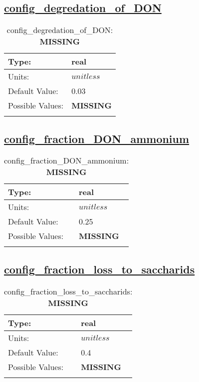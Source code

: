 \subsection[config\_degredation\_of\_DON]{\hyperref[sec:nm_tab_biogeochemistry]{config\_degredation\_of\_DON}}
\label{subsec:nm_sec_config_degredation_of_DON}
\begin{center}
\begin{longtable}{| p{2.0in} || p{4.0in} |}
    \hline
    Type: & real \\
    \hline
    Units: & $unitless$ \\
    \hline
    Default Value: & 0.03 \\
    \hline
    Possible Values: & {\bf \color{red} MISSING} \\
    \hline
    \caption{config\_degredation\_of\_DON: {\bf \color{red} MISSING}}
\end{longtable}
\end{center}
\subsection[config\_fraction\_DON\_ammonium]{\hyperref[sec:nm_tab_biogeochemistry]{config\_fraction\_DON\_ammonium}}
\label{subsec:nm_sec_config_fraction_DON_ammonium}
\begin{center}
\begin{longtable}{| p{2.0in} || p{4.0in} |}
    \hline
    Type: & real \\
    \hline
    Units: & $unitless$ \\
    \hline
    Default Value: & 0.25 \\
    \hline
    Possible Values: & {\bf \color{red} MISSING} \\
    \hline
    \caption{config\_fraction\_DON\_ammonium: {\bf \color{red} MISSING}}
\end{longtable}
\end{center}
\subsection[config\_fraction\_loss\_to\_saccharids]{\hyperref[sec:nm_tab_biogeochemistry]{config\_fraction\_loss\_to\_saccharids}}
\label{subsec:nm_sec_config_fraction_loss_to_saccharids}
\begin{center}
\begin{longtable}{| p{2.0in} || p{4.0in} |}
    \hline
    Type: & real \\
    \hline
    Units: & $unitless$ \\
    \hline
    Default Value: & 0.4 \\
    \hline
    Possible Values: & {\bf \color{red} MISSING} \\
    \hline
    \caption{config\_fraction\_loss\_to\_saccharids: {\bf \color{red} MISSING}}
\end{longtable}
\end{center}
